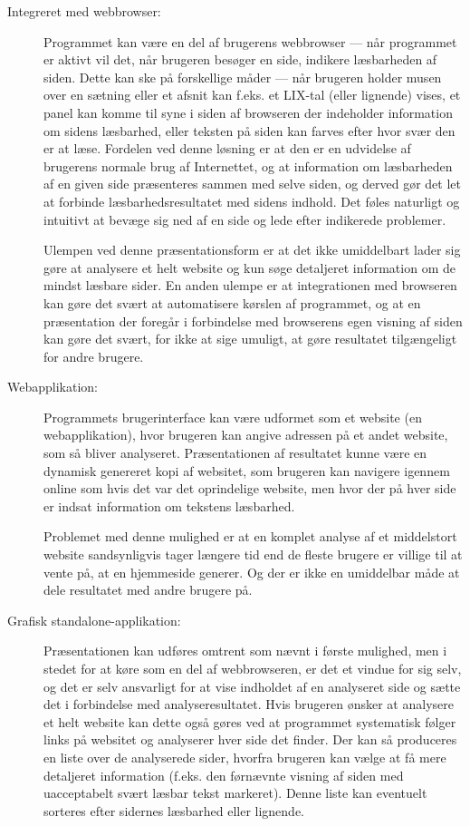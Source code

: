 \documentclass[a4paper,oneside,article]{memoir}
\begin{document}
\begin{description}
\item[Integreret med webbrowser:]
  Programmet kan være en del af brugerens webbrowser --- når
  programmet er aktivt vil det, når brugeren besøger en side, indikere
  læsbarheden af siden. Dette kan ske på forskellige måder --- når
  brugeren holder musen over en sætning eller et afsnit kan f.eks. et
  LIX-tal (eller lignende) vises, et panel kan komme til syne i siden
  af browseren der indeholder information om sidens læsbarhed, eller
  teksten på siden kan farves efter hvor svær den er at læse. Fordelen
  ved denne løsning er at den er en udvidelse af brugerens normale
  brug af Internettet, og at information om læsbarheden af en given
  side præsenteres sammen med selve siden, og derved gør det let at
  forbinde læsbarhedsresultatet med sidens indhold. Det føles
  naturligt og intuitivt at bevæge sig ned af en side og lede efter
  indikerede problemer. 

  Ulempen ved denne præsentationsform er at det ikke umiddelbart lader
  sig gøre at analysere et helt website og kun søge detaljeret
  information om de mindst læsbare sider. En anden ulempe er at
  integrationen med browseren kan gøre det svært at automatisere
  kørslen af programmet, og at en præsentation der foregår i
  forbindelse med browserens egen visning af siden kan gøre det svært,
  for ikke at sige umuligt, at gøre resultatet tilgængeligt for andre
  brugere.

\item[Webapplikation:]
  Programmets brugerinterface kan være udformet som et website (en
  webapplikation), hvor brugeren kan angive adressen på et andet
  website, som så bliver analyseret. Præsentationen af resultatet
  kunne være en dynamisk genereret kopi af websitet, som brugeren kan
  navigere igennem online som hvis det var det oprindelige website,
  men hvor der på hver side er indsat information om tekstens
  læsbarhed. 

  Problemet med denne mulighed er at en komplet analyse af et
  middelstort website sandsynligvis tager længere tid end de fleste
  brugere er villige til at vente på, at en hjemmeside generer. Og der er ikke
  en umiddelbar måde at dele resultatet med andre brugere på.

\item[Grafisk standalone-applikation:] 
  Præsentationen kan udføres omtrent som nævnt i første mulighed, men
  i stedet for at køre som en del af webbrowseren, er det et vindue
  for sig selv, og det er selv ansvarligt for at vise indholdet af en
  analyseret side og sætte det i forbindelse med
  analyseresultatet. Hvis brugeren ønsker at analysere et helt website
  kan dette også gøres ved at programmet systematisk følger links på
  websitet og analyserer hver side det finder. Der kan så produceres
  en liste over de analyserede sider, hvorfra brugeren kan vælge at få
  mere detaljeret information (f.eks. den førnævnte visning af siden
  med uacceptabelt svært læsbar tekst markeret). Denne liste kan
  eventuelt sorteres efter sidernes læsbarhed eller lignende.


\end{description}
\end{document}

